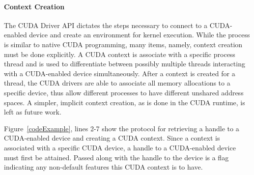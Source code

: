 \lstset{ language=HTML5, numbers=left, stepnumber=1 }
\begin{figure*}
	\begin{center}
		\small
		
	\end{center}
	\caption{Simple \name Example}
	\label{codeExample}
\end{figure*}

\paragraph{Context Creation} The CUDA Driver API dictates the steps necessary to
connect to a CUDA-enabled device and create an environment for kernel execution.
While the process is similar to native CUDA programming, many items, namely,
context creation must be done explicitly. A CUDA context is associate with a
specific process thread and is used to differentiate between possibly multiple
threads interacting with a CUDA-enabled device simultaneously. After a context
is created for a thread, the CUDA drivers are able to associate all memory
allocations to a specific device, thus allow different processes to have
different unshared address spaces.  A simpler, implicit context creation, as is
done in the CUDA runtime, is left as future work.

 Figure~\ref{codeExample}, lines 2-7 show the protocol for
retrieving a handle to a CUDA-enabled device and creating a CUDA context. Since
a context is associated with a specific CUDA device, a handle to a CUDA-enabled
device must first be attained. Passed along with the handle to the device is a
flag indicating any non-default features this CUDA context is to have.

